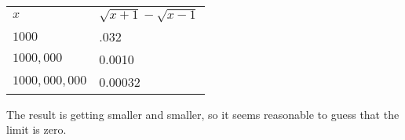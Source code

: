 \begin{tabular}{ll}
$x$ & $\sqrt{x+1}-\sqrt{x-1}$ \\
$1000$ & .032 \\
$1000,000$ & 0.0010 \\
$1000,000,000$ & 0.00032
\end{tabular}

The result is getting smaller and smaller, so it seems reasonable to guess that
the limit is zero.

